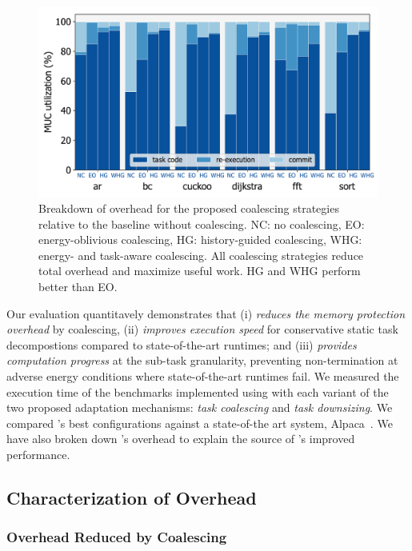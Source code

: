 \begin{figure}
	\centering
	\includegraphics[width=0.5\columnwidth]{figures/coalEfficiency}
    \caption{Breakdown of overhead for the proposed coalescing strategies
relative to the baseline without coalescing.
NC: no coalescing, EO: energy-oblivious coalescing, HG: history-guided coalescing, WHG:
energy- and task-aware coalescing. All coalescing strategies reduce total
overhead and maximize useful work. HG and WHG perform better than EO.}
	\label{fig:overallOverheadBreakdown}
\end{figure}

Our evaluation quantitavely demonstrates that \sys (i) \emph{reduces the memory
protection overhead} by coalescing, (ii) \emph{improves execution speed} for
conservative static task decompostions compared to state-of-the-art runtimes; %
and (iii) \emph{provides computation progress} at the sub-task granularity,
preventing non-termination at adverse energy conditions where state-of-the-art
runtimes fail. We measured the execution time of the benchmarks implemented
using \sys with each variant of the two proposed adaptation mechanisms:
\emph{task coalescing} and \emph{task downsizing}. We compared \sys's best
configurations against a state-of-the art system, Alpaca~\cite{alpaca}. We have
also broken down \sys's overhead to explain the source of \sys's improved
performance.

\subsection{Characterization of Overhead}
\label{sec:coala_overhead}


\subsubsection{Overhead Reduced by Coalescing}
\label{sec:overhead-coalescing}

